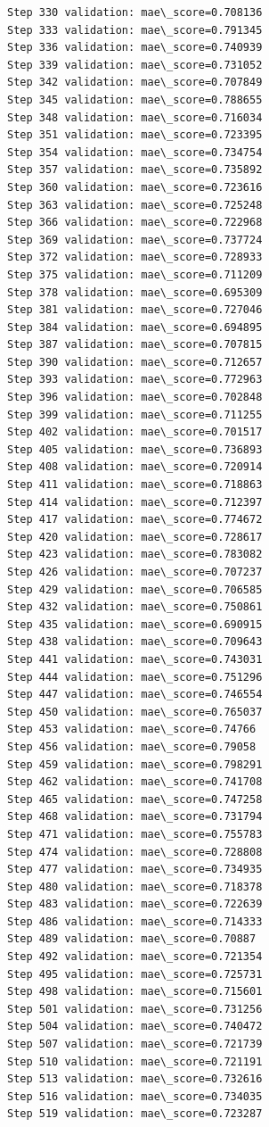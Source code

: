 \documentclass[11pt]{article}
\begin{document}
\begin{Verbatim}[commandchars=\\\{\}]
Step 330 validation: mae\_score=0.708136
Step 333 validation: mae\_score=0.791345
Step 336 validation: mae\_score=0.740939
Step 339 validation: mae\_score=0.731052
Step 342 validation: mae\_score=0.707849
Step 345 validation: mae\_score=0.788655
Step 348 validation: mae\_score=0.716034
Step 351 validation: mae\_score=0.723395
Step 354 validation: mae\_score=0.734754
Step 357 validation: mae\_score=0.735892
Step 360 validation: mae\_score=0.723616
Step 363 validation: mae\_score=0.725248
Step 366 validation: mae\_score=0.722968
Step 369 validation: mae\_score=0.737724
Step 372 validation: mae\_score=0.728933
Step 375 validation: mae\_score=0.711209
Step 378 validation: mae\_score=0.695309
Step 381 validation: mae\_score=0.727046
Step 384 validation: mae\_score=0.694895
Step 387 validation: mae\_score=0.707815
Step 390 validation: mae\_score=0.712657
Step 393 validation: mae\_score=0.772963
Step 396 validation: mae\_score=0.702848
Step 399 validation: mae\_score=0.711255
Step 402 validation: mae\_score=0.701517
Step 405 validation: mae\_score=0.736893
Step 408 validation: mae\_score=0.720914
Step 411 validation: mae\_score=0.718863
Step 414 validation: mae\_score=0.712397
Step 417 validation: mae\_score=0.774672
Step 420 validation: mae\_score=0.728617
Step 423 validation: mae\_score=0.783082
Step 426 validation: mae\_score=0.707237
Step 429 validation: mae\_score=0.706585
Step 432 validation: mae\_score=0.750861
Step 435 validation: mae\_score=0.690915
Step 438 validation: mae\_score=0.709643
Step 441 validation: mae\_score=0.743031
Step 444 validation: mae\_score=0.751296
Step 447 validation: mae\_score=0.746554
Step 450 validation: mae\_score=0.765037
Step 453 validation: mae\_score=0.74766
Step 456 validation: mae\_score=0.79058
Step 459 validation: mae\_score=0.798291
Step 462 validation: mae\_score=0.741708
Step 465 validation: mae\_score=0.747258
Step 468 validation: mae\_score=0.731794
Step 471 validation: mae\_score=0.755783
Step 474 validation: mae\_score=0.728808
Step 477 validation: mae\_score=0.734935
Step 480 validation: mae\_score=0.718378
Step 483 validation: mae\_score=0.722639
Step 486 validation: mae\_score=0.714333
Step 489 validation: mae\_score=0.70887
Step 492 validation: mae\_score=0.721354
Step 495 validation: mae\_score=0.725731
Step 498 validation: mae\_score=0.715601
Step 501 validation: mae\_score=0.731256
Step 504 validation: mae\_score=0.740472
Step 507 validation: mae\_score=0.721739
Step 510 validation: mae\_score=0.721191
Step 513 validation: mae\_score=0.732616
Step 516 validation: mae\_score=0.734035
Step 519 validation: mae\_score=0.723287

\end{Verbatim}
\end{document}
